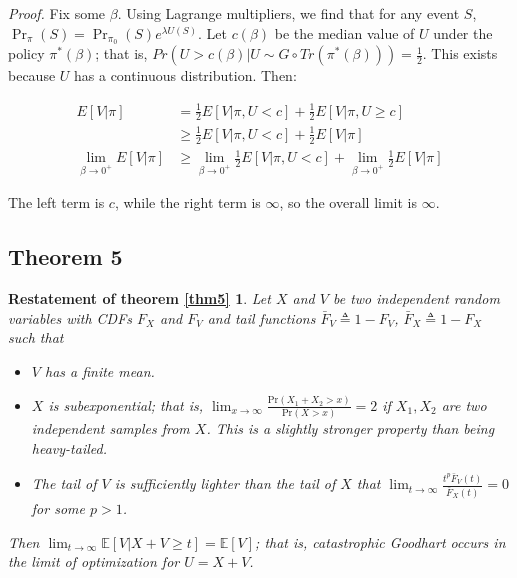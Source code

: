 \documentclass{article}
\begin{document}
\emph{Proof.} Fix some \(\beta\). Using Lagrange multipliers, we find
that for any event \(S\),
\(\Pr_\pi(S) = \Pr_{\pi_0}(S) e^{\lambda U(S)}\). Let \(c(\beta)\) be
the median value of \(U\) under the policy \(\pi^*(\beta)\); that is,
\(Pr(U > c(\beta) | U \sim G \circ Tr(\pi^*(\beta))) = \frac 1 2.\) This
exists because \(U\) has a continuous distribution. Then:

\begin{align*}E[V | \pi] &= \frac 1 2 E[V | \pi, U < c] + \frac 1 2 E[V | \pi, U \ge c]
\\ &\ge \frac 1 2 E[V | \pi, U < c] + \frac 1 2 E[V | \pi]
\\ \lim_{\beta \to 0^+} E[V | \pi] &\ge \lim_{\beta \to 0^+} \frac 1 2 E[V | \pi, U < c] + \lim_{\beta \to 0^+} \frac 1 2 E[V | \pi]
\end{align*}

The left term is \(c\), while the right term is \(\infty\), so the
overall limit is \(\infty\).

\subsection{Theorem 5}

\newtheorem*{theorem5}{Restatement of theorem {\ref{thm5}}}
\begin{theorem5}
    Let $X$ and $V$ be two independent random variables with CDFs $F_X$ and $F_V$ and tail functions $\bar F_V \triangleq 1 - F_V$, $\bar F_X \triangleq 1 - F_X$ such that
    \begin{itemize}
        \item $V$ has a finite mean.
        \item $X$ is subexponential; that is, $\lim_{x\to\infty}\frac{\text{Pr}(X_1+X_2>x)}{\text{Pr}(X>x)} = 2$ if $X_1, X_2$ are two independent samples from $X$. This is a slightly stronger property than being heavy-tailed.
        \item The tail of $V$ is sufficiently lighter than the tail of $X$ that \(\lim_{t\to\infty}\frac{t^p\bar F_V(t)}{\bar F_X(t)} = 0\) for some \(p > 1\).
    \end{itemize}
    Then $\lim_{t \to \infty} \mathbb E[V | X + V \ge t] =\mathbb{E}[V]$; that is, catastrophic Goodhart occurs in the limit of optimization for $U=X+V$.
\end{theorem5}


\end{document}
